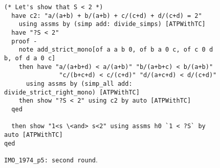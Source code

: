 \documentclass{article} \usepackage{iclr2024_conference,times}
\begin{document}
\begin{figure}[H]
\begin{tcolorbox}[colback=mybrown!5!white,colframe=mybrown!75!black]
\begin{small}
\begin{lstlisting}[style=isabelle]
  (* Let's show that S < 2 *)
  have c2: "a/(a+b) + b/(a+b) + c/(c+d) + d/(c+d) = 2" 
    using assms by (simp add: divide_simps) [ATPWithTC]
  have "?S < 2" 
  proof -
    note add_strict_mono[of a a b 0, of b a 0 c, of c 0 d b, of d a 0 c]
    then have "a/(a+b+d) < a/(a+b)" "b/(a+b+c) < b/(a+b)" 
               "c/(b+c+d) < c/(c+d)" "d/(a+c+d) < d/(c+d)"
      using assms by (simp_all add: divide_strict_right_mono) [ATPWithTC]
    then show "?S < 2" using c2 by auto [ATPWithTC]
  qed
  
  then show "1<s \<and> s<2" using assms h0 `1 < ?S` by auto [ATPWithTC]
qed

\end{lstlisting}
\end{small}
\end{tcolorbox}
\caption{
\small
\texttt{IMO\_1974\_p5: second round}.
}
\label{fig:case_study imo 1973 p5 2}
\end{figure}



\newpage
\end{document}
